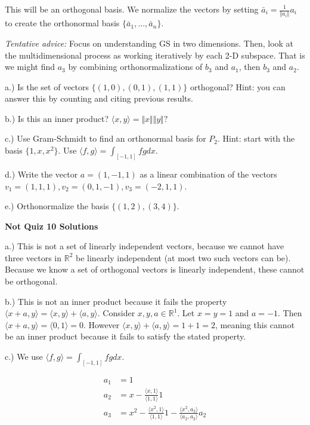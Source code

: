 \documentclass{article}
\begin{document}
This will be an orthogonal basis. We normalize the vectors by setting $\bar{a}_i= \frac{1}{\Vert a_i \Vert} a_i$ to create the orthonormal basis $\{\bar{a}_1, \dots, \bar{a}_n\}$.

\emph{Tentative advice:} Focus on understanding GS in two dimensions. Then, look at the multidimensional process as working iteratively by each 2-D subspace. That is we might find $a_3$ by combining orthonormalizations of $b_3$ and $a_1$, then $b_3$ and $a_2$. 



a.) Is the set of vectors $\{(1,0), (0,1),(1,1)\}$ orthogonal? Hint: you can answer this by counting and citing previous results. 




b.) Is this an inner product? $\langle x, y\rangle = \Vert x \Vert \Vert y \Vert?$

c.) Use Gram-Schmidt to find an orthonormal basis for $P_2$. Hint: start with the basis $\{1,x,x^2\}$. Use $\langle f,g\rangle = \int_{[-1,1]}fg dx$.

d.) Write the vector $a=(1,-1,1)$ as a linear combination of the vectors $v_1 = (1,1,1), v_2=(0,1,-1), v_3=(-2,1,1)$.

e.) Orthonormalize the basis $\{(1,2),(3,4)\}$.


\pagebreak
\textbf{Not Quiz 10 Solutions}

a.) This is not a set of linearly independent vectors, because we cannot have three vectors in $\mathbb{R}^2$ be linearly independent (at most two such vectors can be). Because we know a set of orthogonal vectors is linearly independent, these cannot be orthogonal. 


b.) This is not an inner product because it fails the property $\langle x+a, y\rangle = \langle x,y\rangle + \langle a, y\rangle$. Consider $x,y,a\in \mathbb{R}^1$. Let $x=y=1$ and $a=-1$. Then $\langle x+a,y\rangle = \langle 0, 1\rangle = 0$. However  $\langle x,y\rangle + \langle a, y\rangle = 1 + 1=2$, meaning this cannot be an inner product because it fails to satisfy the stated property. 


c.) We use $\langle f,g\rangle = \int_{[-1,1]}fg dx$.

\begin{align*}
a_1 &= 1 \\
a_2 &= x - \frac{\langle x,1\rangle}{\langle 1, 1\rangle}1\\
a_3 & = x^2 - \frac{\langle x^2,1\rangle}{\langle 1, 1\rangle}1 - \frac{\langle x^2,a_2\rangle}{\langle a_2, a_2\rangle}a_2
\end{align*}
\end{document}
